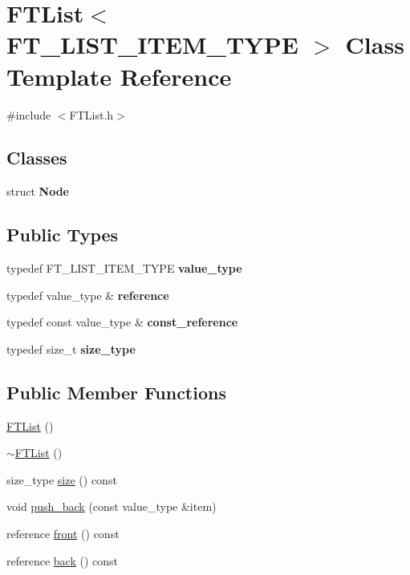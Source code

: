 \hypertarget{class_f_t_list}{
\section{FTList$<$ FT\_\-LIST\_\-ITEM\_\-TYPE $>$ Class Template Reference}
\label{class_f_t_list}
}


{\ttfamily \#include $<$FTList.h$>$}

\subsection*{Classes}
\begin{DoxyCompactItemize}
\item 
struct {\bfseries Node}
\end{DoxyCompactItemize}
\subsection*{Public Types}
\begin{DoxyCompactItemize}
\item 
\hypertarget{class_f_t_list_ae172da3e03bcd6dab4b5f60efe0fc7a3}{
typedef FT\_\-LIST\_\-ITEM\_\-TYPE {\bfseries value\_\-type}}
\label{class_f_t_list_ae172da3e03bcd6dab4b5f60efe0fc7a3}

\item 
\hypertarget{class_f_t_list_a37fe33040a67a2d5aad9ead2bb2179d7}{
typedef value\_\-type \& {\bfseries reference}}
\label{class_f_t_list_a37fe33040a67a2d5aad9ead2bb2179d7}

\item 
\hypertarget{class_f_t_list_a82677d676935b1f3cb5e9328523bf3a6}{
typedef const value\_\-type \& {\bfseries const\_\-reference}}
\label{class_f_t_list_a82677d676935b1f3cb5e9328523bf3a6}

\item 
\hypertarget{class_f_t_list_a5ebe9866c4f86791c6970f19deb09cb1}{
typedef size\_\-t {\bfseries size\_\-type}}
\label{class_f_t_list_a5ebe9866c4f86791c6970f19deb09cb1}

\end{DoxyCompactItemize}
\subsection*{Public Member Functions}
\begin{DoxyCompactItemize}
\item 
\hyperlink{class_f_t_list_a4de727811240b9d8568d1d47fd389502}{FTList} ()
\item 
\hyperlink{class_f_t_list_aabfac3b136119f727611d490aef3eab4}{$\sim$FTList} ()
\item 
size\_\-type \hyperlink{class_f_t_list_a73542705ba9556d5cd594c3ec32fe5d2}{size} () const 
\item 
void \hyperlink{class_f_t_list_acd30af5d1a32185842decac3e0c183ce}{push\_\-back} (const value\_\-type \&item)
\item 
reference \hyperlink{class_f_t_list_a068805ebb222e9ce69a8828b31fd87df}{front} () const 
\item 
reference \hyperlink{class_f_t_list_ae6b5f56991e9d2ac226ce7960e4661f4}{back} () const 
\end{DoxyCompactItemize}


